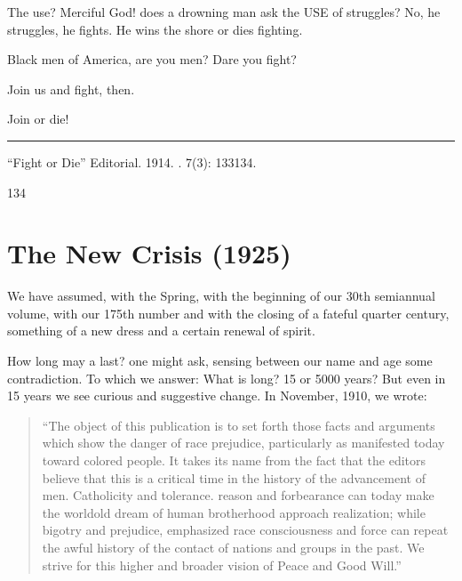 \documentclass[letterpaper,10pt,english]{jupyterBook}
\begin{document}
\sphinxAtStartPar
The use? Merciful God! does a drowning man ask the USE of struggles? No, he struggles, he fights. He wins the shore or dies fighting.

\sphinxAtStartPar
Black men of America, are you men? Dare you fight?

\sphinxAtStartPar
Join us and fight, then.

\sphinxAtStartPar
Join or die!


\bigskip\hrule\bigskip


\sphinxAtStartPar
{} “Fight or Die” Editorial. 1914. . 7(3): 133\sphinxhyphen{}134.

\sphinxhyphen{}134


\section{The New Crisis (1925)}
\label{\detokenize{Volumes/30/01/new_crisis:the-new-crisis-1925}}\label{\detokenize{Volumes/30/01/new_crisis::doc}}
\sphinxAtStartPar
We have assumed, with the Spring, with the beginning  of our 30th semi\sphinxhyphen{}annual volume, with our 175th number and with the closing of a fateful quarter century, something of a new dress and a certain renewal of spirit.

\sphinxAtStartPar
How long may a  last? one might ask, sensing between our name and age some contradiction. To which we answer: What is long? 15 or 5000 years? But even in 15 years we see curious and suggestive change. In November, 1910, we wrote:
\begin{quote}

\sphinxAtStartPar
“The object of this publication is to set forth those facts and arguments which show the danger of race prejudice, particularly as manifested today toward colored people. It takes its name from the fact that the editors believe that this is a critical time in the history of the advancement of men. Catholicity and tolerance. reason and forbearance can today make the world\sphinxhyphen{}old dream of human brotherhood approach realization; while bigotry and prejudice, emphasized race consciousness and force can repeat the awful history of the contact of nations and groups in the past. We strive for this higher and broader vision of Peace and Good Will.”
\end{quote}
\end{document}
